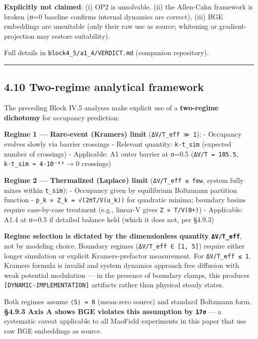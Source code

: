 \documentclass[
]{article}
\begin{document}
\textbf{Explicitly not claimed}: (i) OP2 is unsolvable, (ii) the
Allen-Cahn framework is broken (σ=0 baseline confirms internal dynamics
are correct), (iii) BGE embeddings are unsuitable (only their raw use as
source; whitening or gradient-projection may restore suitability).

Full details in \texttt{block4\_5/a1\_4/VERDICT.md} (companion
repository).

\begin{center}\rule{0.5\linewidth}{0.5pt}\end{center}

\hypertarget{two-regime-analytical-framework}{%
\subsection{4.10 Two-regime analytical
framework}\label{two-regime-analytical-framework}}

The preceding Block IV.5 analyses make explicit use of a
\textbf{two-regime dichotomy} for occupancy prediction:

\textbf{Regime 1 --- Rare-event (Kramers) limit}
(\texttt{ΔV/T\_eff\ ≫\ 1}): - Occupancy evolves slowly via barrier
crossings - Relevant quantity: \texttt{k·t\_sim} (expected number of
crossings) - Applicable: A1 outer barrier at σ=0.5
(\texttt{ΔV/T\ =\ 105.5}, \texttt{k·t\_sim\ ≈\ 4·10⁻⁴³} → 0 crossings)

\textbf{Regime 2 --- Thermalized (Laplace) limit}
(\texttt{ΔV/T\_eff\ ≲\ few}, system fully mixes within \texttt{t\_sim}):
- Occupancy given by equilibrium Boltzmann partition function -
\texttt{p\_k\ ∝\ Z\_k\ =\ √(2πT/V\textquotesingle{}\textquotesingle{}(u\_k))}
for quadratic minima; boundary basins require case-by-case treatment
(e.g., linear-V gives
\texttt{Z\ ∝\ T/\textbar{}V\textquotesingle{}(0+)\textbar{}}) -
Applicable: A1.4 at σ=0.5 if detailed balance held (which it does not,
per §4.9.3)

\textbf{Regime selection is dictated by the dimensionless quantity
\texttt{ΔV/T\_eff}}, not by modeling choice. Boundary regimes
(\texttt{ΔV/T\_eff\ ∈\ {[}1,\ 5{]}}) require either longer simulation or
explicit Kramers-prefactor measurement. For \texttt{ΔV/T\_eff\ ≤\ 1},
Kramers formula is invalid and system dynamics approach free diffusion
with weak potential modulation --- in the presence of boundary clamps,
this produces \texttt{{[}DYNAMIC-IMPLEMENTATION{]}} artifacts rather
than physical steady states.

Both regimes assume \texttt{⟨S⟩\ =\ 0} (mean-zero source) and standard
Boltzmann form. \textbf{§4.9.3 Axis A shows BGE violates this assumption
by \texttt{17σ}} --- a systematic caveat applicable to all MaoField
experiments in this paper that use raw BGE embeddings as source.
\end{document}
